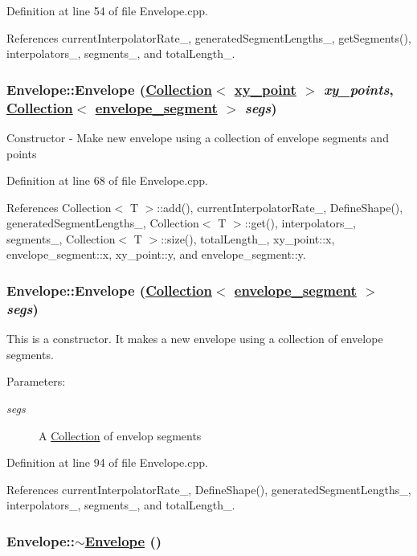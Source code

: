 Definition at line 54 of file Envelope.cpp.

References current\-Interpolator\-Rate\_\-, generated\-Segment\-Lengths\_\-, get\-Segments(), interpolators\_\-, segments\_\-, and total\-Length\_\-.\hypertarget{classEnvelope_a2}{
\subsubsection[Envelope]{\setlength{\rightskip}{0pt plus 5cm}Envelope::Envelope (\hyperlink{classCollection}{Collection}$<$ \hyperlink{structxy__point}{xy\_\-point} $>$ {\em xy\_\-points}, \hyperlink{classCollection}{Collection}$<$ \hyperlink{structenvelope__segment}{envelope\_\-segment} $>$ {\em segs})}}
\label{classEnvelope_a2}


Constructor - Make new envelope using a collection of envelope segments and points 

Definition at line 68 of file Envelope.cpp.

References Collection$<$ T $>$::add(), current\-Interpolator\-Rate\_\-, Define\-Shape(), generated\-Segment\-Lengths\_\-, Collection$<$ T $>$::get(), interpolators\_\-, segments\_\-, Collection$<$ T $>$::size(), total\-Length\_\-, xy\_\-point::x, envelope\_\-segment::x, xy\_\-point::y, and envelope\_\-segment::y.\hypertarget{classEnvelope_a3}{
\subsubsection[Envelope]{\setlength{\rightskip}{0pt plus 5cm}Envelope::Envelope (\hyperlink{classCollection}{Collection}$<$ \hyperlink{structenvelope__segment}{envelope\_\-segment} $>$ {\em segs})}}
\label{classEnvelope_a3}


This is a constructor. It makes a new envelope using a collection of envelope segments. \begin{Desc}
\item[Parameters:]
\begin{description}
\item[{\em segs}]A \hyperlink{classCollection}{Collection} of envelop segments \end{description}
\end{Desc}


Definition at line 94 of file Envelope.cpp.

References current\-Interpolator\-Rate\_\-, Define\-Shape(), generated\-Segment\-Lengths\_\-, interpolators\_\-, segments\_\-, and total\-Length\_\-.\hypertarget{classEnvelope_a4}{
\subsubsection[$\sim$Envelope]{\setlength{\rightskip}{0pt plus 5cm}Envelope::$\sim$\hyperlink{classEnvelope}{Envelope} ()}}
\label{classEnvelope_a4}


